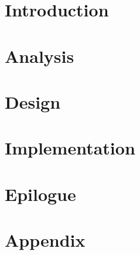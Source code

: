 
\raggedbottom


	
	\frontmatter
	
	
	
	\setlength\parskip{0ex}
	\tableofcontents*
	\setlength{\parskip}{3mm}
	
	\newpage
	
	\mainmatter
	
	\newpage
	\listoffixmes
	
	\part{Introduction}
	
		
	\part{Analysis}

	\part{Design}

	\part{Implementation}

	\part{Epilogue}
	
	
	\begingroup
		\raggedright
		
	\endgroup
	
	
	
	 \clearforchapter
	 \part*{Appendix}
	 \appendix
	 
	
	
%	
	

